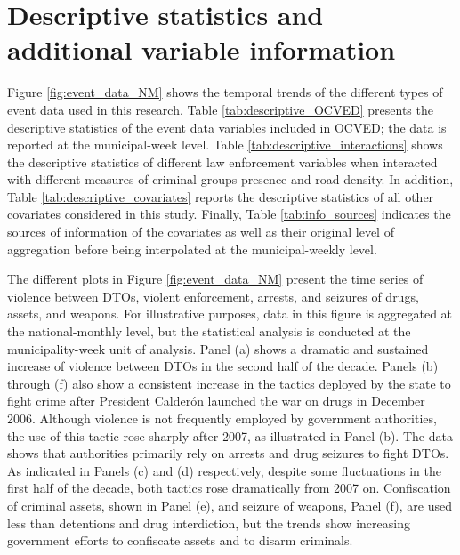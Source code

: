 \documentclass[12pt,letterpaper]{article}
\begin{document}

\clearpage

\section{Descriptive statistics and additional variable information}

Figure \ref{fig:event_data_NM} shows the temporal trends of the different types of event data used in this research. Table \ref{tab:descriptive_OCVED} presents the descriptive statistics of the event data variables included in OCVED; the data is reported at the municipal-week level. Table \ref{tab:descriptive_interactions} shows the descriptive statistics of different law enforcement variables when interacted with different measures of criminal groups presence and road density. In addition, Table \ref{tab:descriptive_covariates} reports the descriptive statistics of all other covariates considered in this study. Finally, Table \ref{tab:info_sources} indicates the sources of information of the covariates as well as their original level of aggregation before being interpolated at the municipal-weekly level.


The different plots in Figure \ref{fig:event_data_NM} present the time series of violence between DTOs, violent enforcement, arrests, and seizures of drugs, assets, and weapons. For illustrative purposes, data in this figure is aggregated at the national-monthly level, but the statistical analysis is conducted at the municipality-week unit of analysis.  Panel (a) shows a dramatic and sustained increase of violence between DTOs in the second half of the decade. Panels (b) through (f) also show a consistent increase in the tactics deployed by the state to fight crime after President Calder\'{o}n launched the war on drugs in December 2006. Although violence is not frequently employed by government authorities, the use of this tactic rose sharply after 2007, as illustrated in Panel (b). The data shows that authorities primarily rely on arrests and drug seizures to fight DTOs. As indicated in Panels (c) and (d) respectively, despite some fluctuations in the first half of the decade, both tactics rose dramatically from 2007 on. Confiscation of criminal assets, shown in Panel (e), and seizure of weapons, Panel (f), are used less than detentions and drug interdiction, but the trends show increasing government efforts to confiscate assets and to disarm criminals.    
\end{document}
